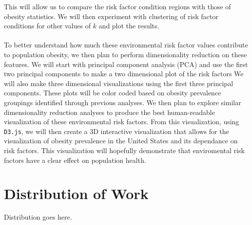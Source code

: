 \documentclass{article}
\begin{document}
This will allow us to compare the risk factor condition regions with those of obesity statistics. 
We will then experiment with clustering of risk factor conditions for other values of $k$ and plot the results.
\\\\
To better understand how much these environmental risk factor values contribute to population obesity, we then plan to perform dimensionality reduction on these features. 
We will start with principal component analysis (PCA) and use the first two principal components to make a two dimensional plot of the risk factors 
We will also make three dimensional visualizations using the first three principal components.
These plots will be color coded based on obesity prevalence groupings identified through previous analyses.
We then plan to explore similar dimensionality reduction analyses to produce the best human-readable visualization of these environmental risk factors. 
From this visualization, using \verb|D3.js|, we will then create a 3D interactive visualization that allows for the visualization of obesity prevalence in the United States and its dependance on risk factors. This visualization will hopefully demonstrate that enviromental risk factors have a clear effect on population health.

\section{Distribution of Work}
\label{distribution}

Distribution goes here.




\end{document}
